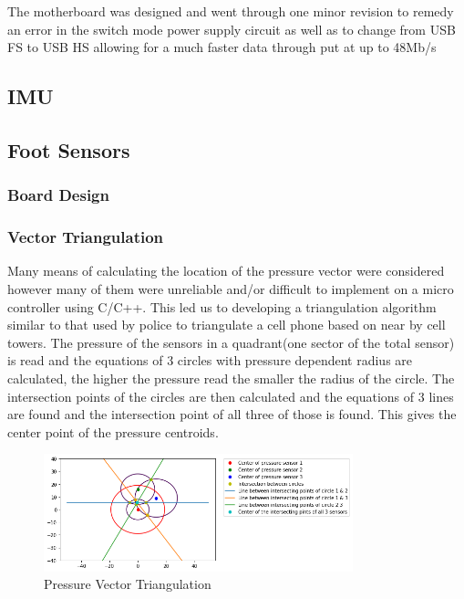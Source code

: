    The motherboard was designed and went through one minor revision to remedy an error in the switch mode power supply circuit as well as to change from USB FS to USB HS allowing for a much faster data  through put at up to 48Mb/s
\subsection{IMU}

\subsection{Foot Sensors}

\subsubsection{Board Design}
\subsubsection{Vector Triangulation}
Many means of calculating the location of the pressure vector were considered however many of them were unreliable and/or difficult to implement on a micro controller using C/C++. This led us to developing a triangulation algorithm similar to that used by police to triangulate a cell phone based on near by cell towers. The pressure of the sensors in a quadrant(one sector of the total sensor) is read and the equations of 3 circles with pressure dependent radius are calculated, the higher the pressure read the smaller the radius of the circle. The intersection points of the circles are then calculated and the equations of 3 lines are found and the intersection point of all three of those is found. This gives the center point of the pressure centroids. 
\begin{figure}[H]
    \centering
    \includegraphics[width=0.8\textwidth]{figures/Triangulation.png}
    \caption{Pressure Vector Triangulation}
    \label{fig:my_label}
\end{figure}